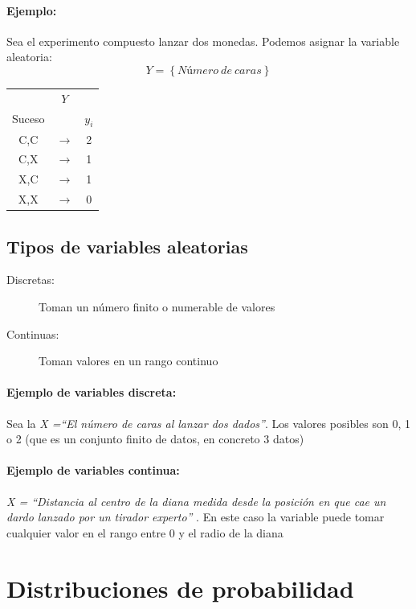 \paragraph{Ejemplo:} Sea el experimento compuesto lanzar dos monedas. Podemos asignar la variable aleatoria: $$Y=\left\lbrace Número \ de \ caras \right\rbrace$$

\begin{center}
\begin{tabular}{ccc}
 & $Y$ &  \\
Suceso &  &  $y_i$\\ \hline 
C,C & $\rightarrow$ & 2 \\ 
C,X & $\rightarrow$ & 1 \\ 
X,C & $\rightarrow$ & 1 \\ 
X,X & $\rightarrow$ & 0 \\ 
\end{tabular} 
\end{center}

\subsection{Tipos de variables aleatorias}
\begin{description}
\item[Discretas:] Toman un número finito o numerable de valores
\item[Continuas:] Toman valores en un rango continuo
\end{description}

\paragraph{Ejemplo de variables discreta:} Sea la \emph{X =“El número de caras al lanzar dos dados”}. Los valores posibles son 0, 1 o 2 (que es un conjunto finito de datos, en concreto 3 datos) 

\paragraph{Ejemplo de variables continua:} \emph{X = “Distancia al centro de la diana medida desde la posición en que cae un dardo lanzado por un tirador experto” }. En este caso la variable puede tomar cualquier valor en el rango entre 0 y el radio de la diana 

\section{Distribuciones de probabilidad}

